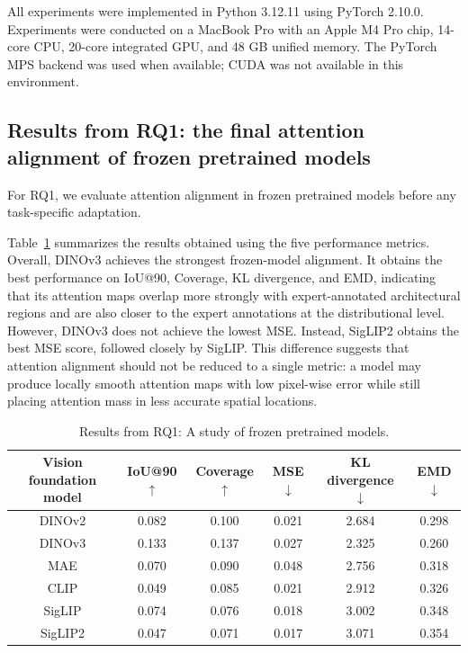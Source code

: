 \documentclass[lineno,pdflatex,sn-mathphys-num]{sn-jnl}%
\theoremstyle{thmstyleone}%
\theoremstyle{thmstyletwo}%
\theoremstyle{thmstylethree}%
\begin{document}
All experiments were implemented in Python 3.12.11 using PyTorch 2.10.0. Experiments were conducted on a MacBook Pro with an Apple M4 Pro chip, 14-core CPU, 20-core integrated GPU, and 48 GB unified memory. The PyTorch MPS backend was used when available; CUDA was not available in this environment.

\subsection{Results from RQ1: the final attention alignment of frozen pretrained models}

For RQ1, we evaluate attention alignment in frozen pretrained models before any task-specific adaptation.

Table~\ref{table RQ1 result} summarizes the results obtained using the five performance metrics. Overall, DINOv3 achieves the strongest frozen-model alignment. It obtains the best performance on IoU@90, Coverage, KL divergence, and EMD, indicating that its attention maps overlap more strongly with expert-annotated architectural regions and are also closer to the expert annotations at the distributional level. However, DINOv3 does not achieve the lowest MSE. Instead, SigLIP2 obtains the best MSE score, followed closely by SigLIP. This difference suggests that attention alignment should not be reduced to a single metric: a model may produce locally smooth attention maps with low pixel-wise error while still placing attention mass in less accurate spatial locations.

\begin{table}[!h]
\centering
\caption{Results from RQ1: A study of frozen pretrained models.\label{table RQ1 result}}
\begin{tabular}{cccccc}
\toprule
Vision foundation model & IoU@90 $\uparrow$ & Coverage $\uparrow$ & MSE $\downarrow$ & KL divergence $\downarrow$ & EMD $\downarrow$ \\ \midrule
DINOv2    & 0.082 & 0.100 & 0.021 & 2.684 & 0.298 \\
DINOv3     & 0.133 & 0.137 & 0.027 & 2.325 & 0.260 \\
MAE        & 0.070 & 0.090 & 0.048 & 2.756 & 0.318 \\
CLIP      & 0.049 & 0.085 & 0.021 & 2.912 & 0.326 \\
SigLIP    & 0.074 & 0.076 & 0.018 & 3.002 & 0.348 \\
SigLIP2   & 0.047 & 0.071 & 0.017 & 3.071 & 0.354 \\ \bottomrule
\end{tabular}
\end{table}
\end{document}
